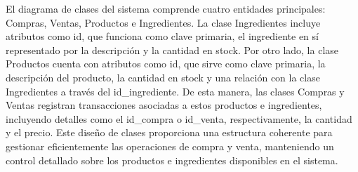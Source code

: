 El diagrama de clases del sistema comprende cuatro entidades principales: Compras, Ventas, Productos e Ingredientes. La clase Ingredientes incluye atributos como id, que funciona como clave primaria, el ingrediente en sí representado por la descripción y la cantidad en stock. Por otro lado, la clase Productos cuenta con atributos como id, que sirve como clave primaria, la descripción del producto, la cantidad en stock y una relación con la clase Ingredientes a través del id\_ingrediente. De esta manera, las clases Compras y Ventas registran transacciones asociadas a estos productos e ingredientes, incluyendo detalles como el id\_compra o id\_venta, respectivamente, la cantidad y el precio. Este diseño de clases proporciona una estructura coherente para gestionar eficientemente las operaciones de compra y venta, manteniendo un control detallado sobre los productos e ingredientes disponibles en el sistema.

